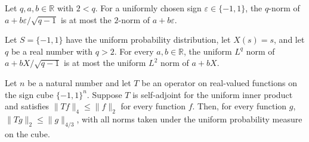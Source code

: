 \begin{theorem}
\label{FABL.oneBit_twoQ_sharp}
\leanok
{}
Let $q,a,b\in\mathbb R$ with $2<q$. For a uniformly chosen sign
$\varepsilon\in\{-1,1\}$, the $q$-norm of $a+b\varepsilon/\sqrt{q-1}$ is at most the
$2$-norm of $a+b\varepsilon$.
\end{theorem}

\begin{theorem}
\label{FABL.uniformSign_twoQHypercontractive}
\leanok
{}
Let $S=\{-1,1\}$ have the uniform probability distribution, let $X(s)=s$, and let $q$ be
a real number with $q>2$. For every $a,b\in\mathbb{R}$, the uniform $L^q$ norm of
$a+bX/\sqrt{q-1}$ is at most the uniform $L^2$ norm of $a+bX$.
\end{theorem}

\begin{theorem}
\label{FABL.selfAdjoint_fourThirdTwo_of_twoFour}
\leanok
{}
Let $n$ be a natural number and let $T$ be an operator on real-valued functions on the
sign cube $\{-1,1\}^n$. Suppose $T$ is self-adjoint for the uniform inner product and
satisfies $\|Tf\|_4\le\|f\|_2$ for every function $f$. Then, for every function $g$,
$\|Tg\|_2\le\|g\|_{4/3}$, with all norms taken under the uniform probability measure on
the cube.
\end{theorem}
